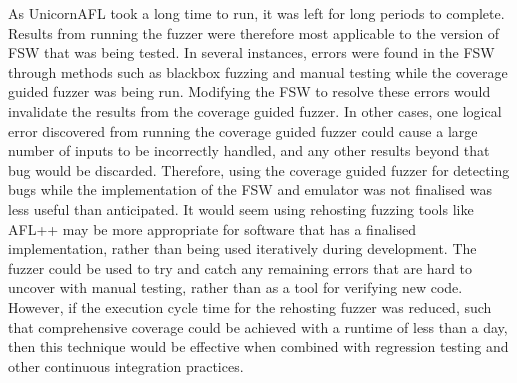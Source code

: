 \documentclass[../report.tex]{subfiles}
\begin{document}
As UnicornAFL took a long time to run, it was left for long periods to
complete. Results from running the fuzzer were therefore most applicable to the
version of FSW that was being tested. In several instances, errors were found
in the FSW through methods such as blackbox fuzzing and manual testing while
the coverage guided fuzzer was being run. Modifying the FSW to resolve these
errors would invalidate the results from the coverage guided fuzzer. In other
cases, one logical error discovered from running the coverage guided fuzzer
could cause a large number of inputs to be incorrectly handled, and any other
results beyond that bug would be discarded. Therefore, using the coverage
guided fuzzer for detecting bugs while the implementation of the FSW and
emulator was not finalised was less useful than anticipated. It would seem
using rehosting fuzzing tools like AFL++ may be more appropriate for software
that has a finalised implementation, rather than being used iteratively during
development. The fuzzer could be used to try and catch any remaining errors
that are hard to uncover with manual testing, rather than as a tool for
verifying new code. However, if the execution cycle time for the rehosting
fuzzer was reduced, such that comprehensive coverage could be achieved with a
runtime of less than a day, then this technique would be effective when
combined with regression testing and other continuous integration practices.



\end{document}
